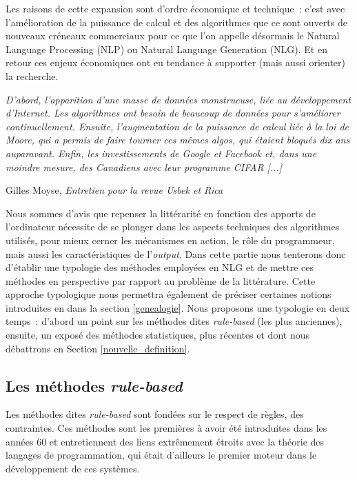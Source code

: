 \documentclass{article}
\newenvironment{citationbox}
{\begin{center}
		\begin{minipage}{.8\textwidth}
		}
		{
		\end{minipage}	
\end{center}
}
\begin{document}
		Les raisons de cette expansion sont d'ordre économique et technique~: c'est avec l'amélioration de la puissance de calcul et des algorithmes que ce sont ouverts de nouveaux créneaux commerciaux pour ce que l'on appelle désormais le Natural Language Processing (NLP) ou Natural Language Generation (NLG). Et en retour ces enjeux économiques ont eu tendance à supporter (mais aussi orienter) la recherche.\\
		\begin{citationbox}
			\textit{D’abord, l’apparition d’une masse de données monstrueuse, liée au développement d’Internet. Les algorithmes ont besoin de beaucoup de données pour s’améliorer continuellement. Ensuite, l’augmentation de la puissance de calcul liée à la loi de Moore, qui a permis de faire tourner ces mêmes algos, qui étaient bloqués dix ans auparavant. Enfin, les investissements de Google et Facebook et, dans une moindre mesure, des Canadiens avec leur programme CIFAR [...]}
			\begin{flushright}
				Gilles Moyse, \textit{Entretien pour la revue Usbek et Rica} \autocite{edin2018}
			\end{flushright}
		\end{citationbox}
		Nous sommes d'avis que repenser la littérarité en fonction des apports de l'ordinateur nécessite de se plonger dans les aspects techniques des algorithmes utilisés, pour mieux cerner les mécanismes en action, le rôle du programmeur, mais aussi les caractéristiques de l'\textit{output}. Dans cette partie nous tenterons donc d'établir une typologie des méthodes employées en NLG et de mettre ces méthodes en perspective par rapport au problème de la littérature. Cette approche typologique nous permettra également de préciser certaines notions introduites en dans la section \ref{genealogie}. Nous proposons une typologie en deux temps~: d'abord un point sur les méthodes dites \textit{rule-based} (les plus anciennes), ensuite, un exposé des méthodes statistiques, plus récentes et dont nous débattrons en Section \ref{nouvelle_definition}.
		
		\subsection{Les méthodes \textit{rule-based}}
			Les méthodes dites \textit{rule-based} sont fondées sur le respect de règles, des contraintes. Ces méthodes sont les premières à avoir été introduites dans les années 60 et entretiennent des liens extrêmement étroits avec la théorie des langages de programmation, qui était d'ailleurs le premier moteur dans le développement de ces systèmes.
\end{document}
